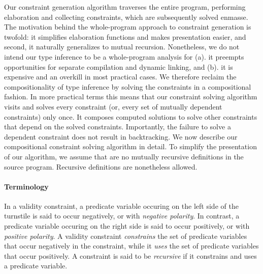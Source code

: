 Our constraint generation algorithm traverses the entire program,
performing elaboration and collecting constraints, which are
subsequently solved enmasse. The motivation behind the whole-program
approach to constraint generation is twofold: it simplifies
elaboration functions and makes presentation easier, and second, it
naturally generalizes to mutual recursion. Nonetheless, we do not
intend our type inference to be a whole-program analysis for (a). it
preempts opportunities for separate compilation and dynamic linking,
and (b). it is expensive and an overkill in most practical cases. We
therefore reclaim the compositionality of type inference by solving
the constraints in a compositional fashion. In more practical terms
this means that our constraint solving algorithm visits and solves
every constraint (or, every set of mutually dependent constraints)
only once. It composes computed solutions to solve other constraints
that depend on the solved constraints. Importantly, the failure to
solve a dependent constraint does not result in backtracking. We now
describe our compositional constraint solving algorithm in detail. To
simplify the presentation of our algorithm, we assume that are no
mutually recursive definitions in the source program. Recursive
definitions are nonetheless allowed.

\paragraph{Terminology} In a validity constraint, a predicate variable
occuring on the left side of the turnstile is said to occur
negatively, or with \emph{negative polarity}. In contrast, a predicate
variable occuring on the right side is said to occur positively, or
with \emph{positive polarity}. A validity constraint
\emph{constrains} the set of predicate variables that occur
negatively in the constraint, while it \emph{uses} the set of
predicate variables that occur positively. A constraint is said to be
\emph{recursive} if it constrains and uses a predicate variable.

